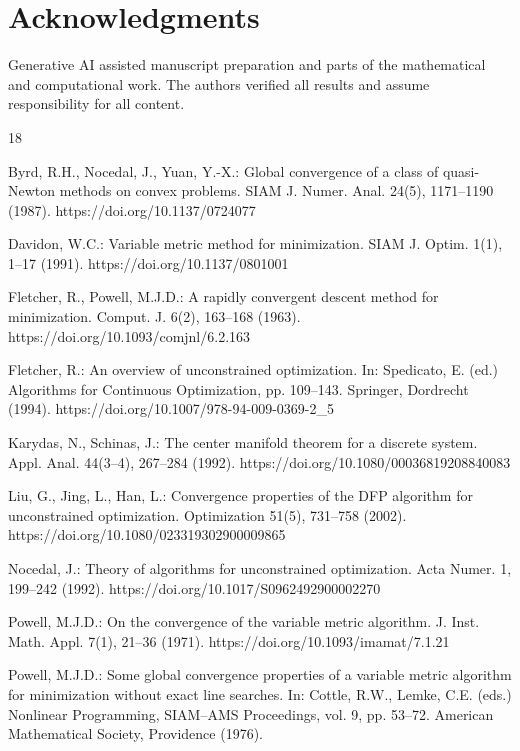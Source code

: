 \documentclass[11pt]{article}
\begin{document}
\section*{Acknowledgments}

Generative AI assisted manuscript preparation and parts of the mathematical
and computational work. The authors verified all results and assume
responsibility for all content.

\begin{thebibliography}{18}

Byrd, R.H., Nocedal, J., Yuan, Y.-X.:
Global convergence of a class of quasi-Newton methods on convex problems.
SIAM J. Numer. Anal. 24(5), 1171--1190 (1987).
https://doi.org/10.1137/0724077

Davidon, W.C.:
Variable metric method for minimization.
SIAM J. Optim. 1(1), 1--17 (1991).
https://doi.org/10.1137/0801001

Fletcher, R., Powell, M.J.D.:
A rapidly convergent descent method for minimization.
Comput. J. 6(2), 163--168 (1963).
https://doi.org/10.1093/comjnl/6.2.163

Fletcher, R.:
An overview of unconstrained optimization.
In: Spedicato, E. (ed.) Algorithms for Continuous Optimization,
pp. 109--143.
Springer, Dordrecht (1994).
https://doi.org/10.1007/978-94-009-0369-2_5

Karydas, N., Schinas, J.:
The center manifold theorem for a discrete system.
Appl. Anal. 44(3--4), 267--284 (1992).
https://doi.org/10.1080/00036819208840083

Liu, G., Jing, L., Han, L.:
Convergence properties of the DFP algorithm for unconstrained optimization.
Optimization 51(5), 731--758 (2002).
https://doi.org/10.1080/023319302900009865

Nocedal, J.:
Theory of algorithms for unconstrained optimization.
Acta Numer. 1, 199--242 (1992).
https://doi.org/10.1017/S0962492900002270

Powell, M.J.D.:
On the convergence of the variable metric algorithm.
J. Inst. Math. Appl. 7(1), 21--36 (1971).
https://doi.org/10.1093/imamat/7.1.21

Powell, M.J.D.:
Some global convergence properties of a variable metric algorithm for
minimization without exact line searches.
In: Cottle, R.W., Lemke, C.E. (eds.) Nonlinear Programming,
SIAM--AMS Proceedings, vol. 9, pp. 53--72.
American Mathematical Society, Providence (1976).


\end{thebibliography}
\end{document}
